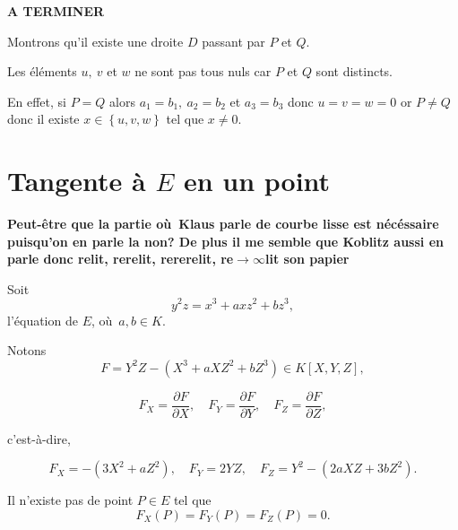 \begin{demonstration}
    \textbf{A TERMINER} 

    Montrons qu'il existe une droite $D$ passant par $P$ et $Q$.

    Les éléments $u, \ v$ et $w$ ne sont pas tous nuls car $P$ et $Q$ sont distincts.

    En effet, si $P = Q$ alors $a_1 = b_1, \ a_2 = b_2 $ et $a_3 = b_3$ donc $u = v = w =0$ or $P \neq Q$ donc il existe $x \in \left\{ u, v, w \right\}$ tel que $x \neq 0$.
    
\end{demonstration}

\section{Tangente à $E$ en un point}
\textbf{Peut-être que la partie où Klaus parle de courbe lisse est nécéssaire puisqu'on en
parle la non? De plus il me semble que Koblitz aussi en parle donc relit, rerelit, rererelit,
re$\to \infty$lit son papier}

Soit 
\[
y^2z = x^3 + axz^2 + bz^3
,\] l'équation de $E$, où $a,b \in K$.

Notons
\[
    F = Y^2Z - \left( X^3 + aXZ^2 + bZ^3 \right) \in K[X,Y,Z]
,\] 

\[
F_{X} = \frac{\partial F}{\partial X},\quad F_{Y} = \frac{\partial F}{\partial Y},\quad F_{Z} = \frac{\partial F}{\partial Z}
,\] 

c'est-à-dire, 

\[
F_{X} = - \left( 3X^2 + aZ^2 \right),\quad F_{Y} = 2YZ,\quad F_{Z} = Y^2 - \left( 2aXZ + 3bZ^2 \right)
.\] 

\begin{lemme}
    \label{lem:lemme3}
    
    Il n'existe pas de point $P \in E$ tel que
    \[
    F_{X}(P) = F_{Y}(P) = F_{Z}(P) = 0
    .\] 
\end{lemme}

